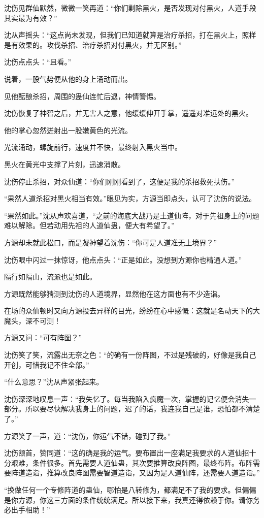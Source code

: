 \begin{this_body}
沈伤见群仙默然，微微一笑再道：“你们剿除黑火，是否发现对付黑火，人道手段其实最为有效？”

沈从声摇头：“这点尚未发现，但我们已知道就算是治疗杀招，打在黑火上，照样是有效果的。攻伐杀招、治疗杀招对付黑火，并无区别。”

沈伤点点头：“且看。”

说着，一股气势便从他的身上涌动而出。

见他酝酿杀招，周围的蛊仙连忙后退，神情警惕。

沈伤恢复了神智之后，并无害人之意，他缓缓伸开手掌，遥遥对准远处的黑火。

他的掌心忽然迸射出一股嫩黄色的光流。

光流涌动，螺旋前行，速度并不快，最终射入黑火当中。

黑火在黄光中支撑了片刻，迅速消散。

沈伤停止杀招，对众仙道：“你们刚刚看到了，这便是我的杀招救死扶伤。”

“果然人道杀招对黑火相当有效。”眼见为实，方源当即点头，认可了沈伤的说法。

“果然如此。”沈从声欢喜道，“之前的海底大战乃是土道仙阵，对于先祖身上的问题难以解除。但若动用先祖的人道仙蛊，便大有希望了。”

方源却未就此松口，而是凝神望着沈伤：“你可是人道准无上境界？”

沈伤眼中闪过一抹惊讶，他点点头：“正是如此。没想到方源你也精通人道。”

隔行如隔山，流派也是如此。

方源既然能够猜测到沈伤的人道境界，显然他在这方面也有不少造诣。

在场的众仙顿时又向方源投去异样的目光，纷纷在心中感慨：这就是名动天下的大魔头，深不可测！

方源又问：“可有阵图？”

沈伤笑了笑，流露出无奈之色：“的确有一份阵图，不过是残破的，好像是我自己开创，可惜我记不住全部。”

“什么意思？”沈从声紧张起来。

沈伤深深地叹息一声：“我失忆了。每当我陷入疯魔一次，掌握的记忆便会消失一部分。所以要尽快解决我身上的问题，迟了的话，我连我自己是谁，恐怕都不清楚了。”

方源笑了一声，道：“沈伤，你运气不错，碰到了我。”

沈伤颔首，赞同道：“这的确是我的运气。要布置出一座满足我要求的人道仙招十分艰难，条件很多。首先需要人道仙蛊，其次要推算改良阵图，最终布阵。布阵需要阵道造诣，推算改良阵图需要智道造诣，又因为是人道仙阵，还需要人道造诣。”

“换做任何一个专修阵道的蛊仙，哪怕是八转修为，都满足不了我的要求。但偏偏是你方源，你这三方面的条件统统满足。所以接下来，我真还得依赖于你。请你务必出手相助！”


\end{this_body}
